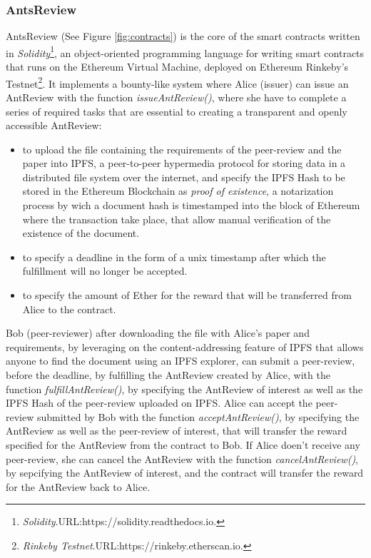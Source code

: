 \documentclass[runningheads]{llncs}
\begin{document}
\subsubsection{AntsReview}
AntsReview (See Figure \ref{fig:contracts}) is the core of the smart contracts written in \emph{Solidity}\footnote[6]{\emph{Solidity}.\textsc{URL:}https://solidity.readthedocs.io.}, an object-oriented programming language for writing smart contracts that runs on the Ethereum Virtual Machine, deployed on Ethereum Rinkeby's Testnet\footnote[7]{\emph{Rinkeby Testnet}.\textsc{URL:}https://rinkeby.etherscan.io.}. It implements a bounty-like system where Alice (issuer) can issue an AntReview with the function \emph{issueAntReview()}, where she have to complete a series of required tasks that are essential to creating a transparent and openly accessible AntReview:
\begin{itemize}
  \item to upload the file containing the requirements of the peer-review and the paper into IPFS\cite{IPFS}, a peer-to-peer hypermedia protocol for storing data in a distributed file system over the internet, and specify the IPFS Hash to be stored in the Ethereum Blockchain as \emph{proof of existence}, a notarization process by wich a document hash is timestamped into the block of Ethereum where the transaction take place, that allow manual verification of the existence of the document.
  \item to specify a deadline in the form of a unix timestamp after which the fulfillment will no longer be accepted.
  \item to specify the amount of Ether for the reward that will be transferred from Alice to the contract.
\end{itemize}

Bob (peer-reviewer) after downloading the file with Alice's paper and requirements, by leveraging on the content-addressing feature of IPFS that allows anyone to find the document using an IPFS explorer, can submit a peer-review, before the deadline, by fulfilling the AntReview created by Alice, with the function \emph{fulfillAntReview()}, by specifying the AntReview of interest as well as the IPFS Hash of the peer-review uploaded on IPFS.
Alice can accept the peer-review submitted by Bob with the function \emph{acceptAntReview()}, by specifying the AntReview as well as the peer-review of interest, that will transfer the reward specified for the AntReview from the contract to Bob.
If Alice doen't receive any peer-review, she can cancel the AntReview with the function \emph{cancelAntReview()}, by sepcifying the AntReview of interest, and the contract will transfer the reward for the AntReview back to Alice.
\end{document}
